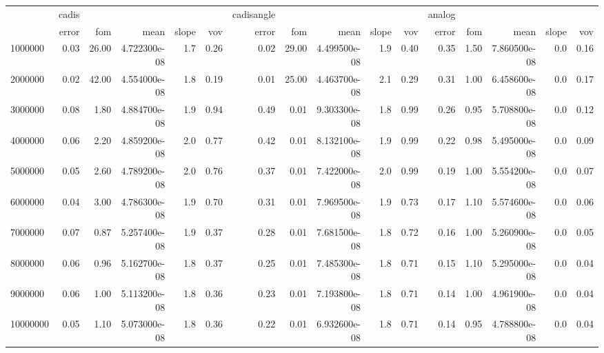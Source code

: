 \begin{tabular}{lrrrrrrrrrrrrrrr}
\toprule
{} & cadis &       &               &       &      & cadisangle &       &               &       &      & analog &      &               &       &      \\
{} & error &   fom &          mean & slope &  vov &      error &   fom &          mean & slope &  vov &  error &  fom &          mean & slope &  vov \\
\midrule
1000000  &  0.03 & 26.00 &  4.722300e-08 &   1.7 & 0.26 &       0.02 & 29.00 &  4.499500e-08 &   1.9 & 0.40 &   0.35 & 1.50 &  7.860500e-08 &   0.0 & 0.16 \\
2000000  &  0.02 & 42.00 &  4.554000e-08 &   1.8 & 0.19 &       0.01 & 25.00 &  4.463700e-08 &   2.1 & 0.29 &   0.31 & 1.00 &  6.458600e-08 &   0.0 & 0.17 \\
3000000  &  0.08 &  1.80 &  4.884700e-08 &   1.9 & 0.94 &       0.49 &  0.01 &  9.303300e-08 &   1.8 & 0.99 &   0.26 & 0.95 &  5.708800e-08 &   0.0 & 0.12 \\
4000000  &  0.06 &  2.20 &  4.859200e-08 &   2.0 & 0.77 &       0.42 &  0.01 &  8.132100e-08 &   1.9 & 0.99 &   0.22 & 0.98 &  5.495000e-08 &   0.0 & 0.09 \\
5000000  &  0.05 &  2.60 &  4.789200e-08 &   2.0 & 0.76 &       0.37 &  0.01 &  7.422000e-08 &   2.0 & 0.99 &   0.19 & 1.00 &  5.554200e-08 &   0.0 & 0.07 \\
6000000  &  0.04 &  3.00 &  4.786300e-08 &   1.9 & 0.70 &       0.31 &  0.01 &  7.969500e-08 &   1.9 & 0.73 &   0.17 & 1.10 &  5.574600e-08 &   0.0 & 0.06 \\
7000000  &  0.07 &  0.87 &  5.257400e-08 &   1.9 & 0.37 &       0.28 &  0.01 &  7.681500e-08 &   1.8 & 0.72 &   0.16 & 1.00 &  5.260900e-08 &   0.0 & 0.05 \\
8000000  &  0.06 &  0.96 &  5.162700e-08 &   1.8 & 0.37 &       0.25 &  0.01 &  7.485300e-08 &   1.8 & 0.71 &   0.15 & 1.10 &  5.295000e-08 &   0.0 & 0.04 \\
9000000  &  0.06 &  1.00 &  5.113200e-08 &   1.8 & 0.36 &       0.23 &  0.01 &  7.193800e-08 &   1.8 & 0.71 &   0.14 & 1.00 &  4.961900e-08 &   0.0 & 0.04 \\
10000000 &  0.05 &  1.10 &  5.073000e-08 &   1.8 & 0.36 &       0.22 &  0.01 &  6.932600e-08 &   1.8 & 0.71 &   0.14 & 0.95 &  4.788800e-08 &   0.0 & 0.04 \\
\bottomrule
\end{tabular}
